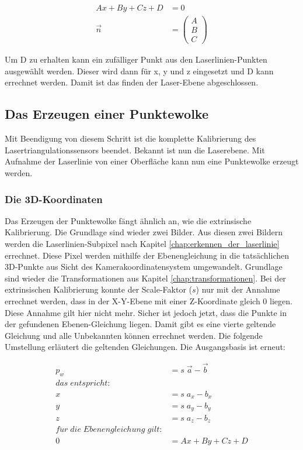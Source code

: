 		\begin{equation}
			\begin{aligned}
				Ax + By +Cz +D &= 0 \\
				\vec{n} &= \begin{pmatrix}
				A \\
				B \\
				C
				\end{pmatrix}
			\end{aligned}
		\end{equation}
		
		Um D zu erhalten kann ein zufälliger Punkt aus den Laserlinien-Punkten ausgewählt werden. Dieser wird dann für x, y und z eingesetzt und D kann errechnet werden. Damit ist das finden der Laser-Ebene abgeschlossen. 
		\label{chap:kalibrierung_extrinsisch}
		
	\subsection{Das Erzeugen einer Punktewolke}
	Mit Beendigung von diesem Schritt ist die komplette Kalibrierung des Lasertriangulationssensors beendet. Bekannt ist nun die Laserebene. Mit Aufnahme der Laserlinie von einer Oberfläche kann nun eine Punktewolke erzeugt werden.
		\subsubsection{Die 3D-Koordinaten}
	Das Erzeugen der Punktewolke fängt ähnlich an, wie die extrinsische Kalibrierung. Die Grundlage sind wieder zwei Bilder. Aus diesen zwei Bildern werden die Laserlinien-Subpixel nach Kapitel \ref{chap:erkennen_der_laserlinie} errechnet. Diese Pixel werden mithilfe der Ebenengleichung in die tatsächlichen 3D-Punkte aus Sicht des Kamerakoordinatensystem umgewandelt. Grundlage sind wieder die Transformationen aus Kapitel \ref{chap:transformationen}. Bei der extrinsischen Kalibrierung konnte der Scale-Faktor (\( s \)) nur mit der Annahme errechnet werden, dass in der X-Y-Ebene mit einer Z-Koordinate gleich 0 liegen. Diese Annahme gilt hier nicht mehr. Sicher ist jedoch jetzt, dass die Punkte in der gefundenen Ebenen-Gleichung liegen. Damit gibt es eine vierte geltende Gleichung und alle Unbekannten können errechnet werden. Die folgende Umstellung erläutert die geltenden Gleichungen. Die Ausgangsbasis ist erneut:
	
	\begin{equation}
		\begin{aligned}
			p_w &= s \; \vec{a} - \vec{b} \\
			das \; entspricht: \\
			x &= s \; a_x - b_x \\
			y &= s \; a_y - b_y \\
			z &= s \; a_z - b_z \\
			f\ddot{u}r \; die \; Ebenengleichung \; gilt: \\
			0 &= Ax + By + Cz + D \\
		\end{aligned}
	\end{equation}
	
